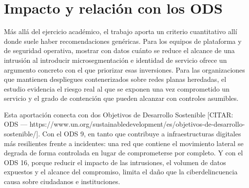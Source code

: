 \documentclass[11pt,spanish,listoffigures,listoftables]{tfgetsinf}
\begin{document}
        \section{Impacto y relación con los ODS}
        Más allá del ejercicio académico, el trabajo aporta un criterio cuantitativo allí donde suele haber recomendaciones genéricas. Para los equipos de plataforma y de seguridad operativa, mostrar con datos cuánto se reduce el alcance de una intrusión al introducir microsegmentación e identidad de servicio ofrece un argumento concreto con el que priorizar esas inversiones. Para las organizaciones que mantienen despliegues contenerizados sobre redes planas heredadas, el estudio evidencia el riesgo real al que se exponen una vez comprometido un servicio y el grado de contención que pueden alcanzar con controles asumibles.

        Esta aportación conecta con dos Objetivos de Desarrollo Sostenible [CITAR: ODS — https://www.un.org/sustainabledevelopment/es/objetivos-de-desarrollo-sostenible/]. Con el ODS 9, en tanto que contribuye a infraestructuras digitales más resilientes frente a incidentes: una red que contiene el movimiento lateral se degrada de forma controlada en lugar de comprometerse por completo. Y con el ODS 16, porque reducir el impacto de las intrusiones, el volumen de datos expuestos y el alcance del compromiso, limita el daño que la ciberdelincuencia causa sobre ciudadanos e instituciones.

\end{document}

